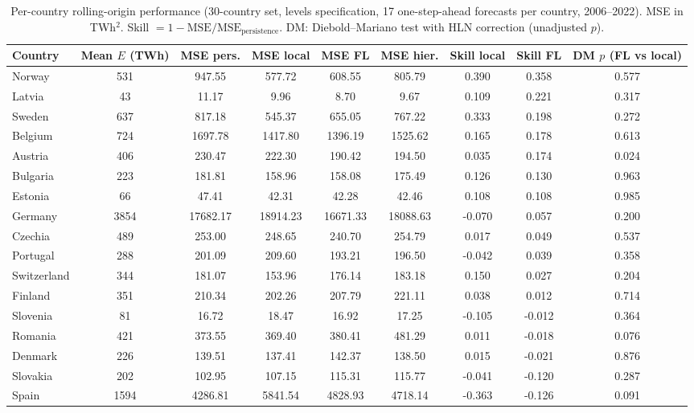 \begin{table}[htbp]
\centering
\caption{Per-country rolling-origin performance (30-country set, levels specification, 17 one-step-ahead forecasts per country, 2006--2022). MSE in TWh$^2$. Skill $= 1 - \mathrm{MSE}/\mathrm{MSE}_{\text{persistence}}$. DM: Diebold--Mariano test with HLN correction (unadjusted $p$).}
\label{tab:per_country}
\begin{tabular}{lcccccccc}
\toprule
Country & Mean $E$ (TWh) & MSE pers. & MSE local & MSE FL & MSE hier. & Skill local & Skill FL & DM $p$ (FL vs local) \\
\midrule
Norway & 531 & 947.55 & 577.72 & 608.55 & 805.79 & 0.390 & 0.358 & 0.577 \\
Latvia & 43 & 11.17 & 9.96 & 8.70 & 9.67 & 0.109 & 0.221 & 0.317 \\
Sweden & 637 & 817.18 & 545.37 & 655.05 & 767.22 & 0.333 & 0.198 & 0.272 \\
Belgium & 724 & 1697.78 & 1417.80 & 1396.19 & 1525.62 & 0.165 & 0.178 & 0.613 \\
Austria & 406 & 230.47 & 222.30 & 190.42 & 194.50 & 0.035 & 0.174 & 0.024 \\
Bulgaria & 223 & 181.81 & 158.96 & 158.08 & 175.49 & 0.126 & 0.130 & 0.963 \\
Estonia & 66 & 47.41 & 42.31 & 42.28 & 42.46 & 0.108 & 0.108 & 0.985 \\
Germany & 3854 & 17682.17 & 18914.23 & 16671.33 & 18088.63 & -0.070 & 0.057 & 0.200 \\
Czechia & 489 & 253.00 & 248.65 & 240.70 & 254.79 & 0.017 & 0.049 & 0.537 \\
Portugal & 288 & 201.09 & 209.60 & 193.21 & 196.50 & -0.042 & 0.039 & 0.358 \\
Switzerland & 344 & 181.07 & 153.96 & 176.14 & 183.18 & 0.150 & 0.027 & 0.204 \\
Finland & 351 & 210.34 & 202.26 & 207.79 & 221.11 & 0.038 & 0.012 & 0.714 \\
Slovenia & 81 & 16.72 & 18.47 & 16.92 & 17.25 & -0.105 & -0.012 & 0.364 \\
Romania & 421 & 373.55 & 369.40 & 380.41 & 481.29 & 0.011 & -0.018 & 0.076 \\
Denmark & 226 & 139.51 & 137.41 & 142.37 & 138.50 & 0.015 & -0.021 & 0.876 \\
Slovakia & 202 & 102.95 & 107.15 & 115.31 & 115.77 & -0.041 & -0.120 & 0.287 \\
Spain & 1594 & 4286.81 & 5841.54 & 4828.93 & 4718.14 & -0.363 & -0.126 & 0.091 \\

\end{tabular}
\end{table}
